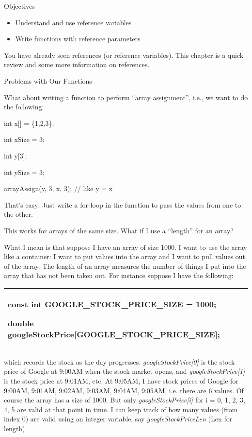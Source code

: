 \documentclass[
]{article}
\author{}
\date{}
\providecommand{\tightlist}{%
  \setlength{\itemsep}{0pt}\setlength{\parskip}{0pt}}
\begin{document}
Objectives

\begin{itemize}
\tightlist
\item
  Understand and use reference variables
\item
  Write functions with reference parameters
\end{itemize}

You have already seen references (or reference variables). This chapter
is a quick review and some more information on references.

Problems with Our Functions

What about writing a function to perform ``array assignment'', i.e., we
want to do the following:

int x{[}{]} = \{1,2,3\};

int xSize = 3;

int y{[}3{]};

int ySize = 3;

arrayAssign(y, 3, x, 3); // like y = x

That's easy: Just write a for-loop in the function to pass the values
from one to the other.

This works for arrays of the same size. What if I use a ``length'' for
an array?

What I mean is that suppose I have an array of size 1000. I want to use
the array like a container: I want to put values into the array and I
want to pull values out of the array. The length of an array measures
the number of things I put into the array that has not been taken out.
For instance suppose I have the following:

\begin{longtable}[]{@{}l@{}}
\toprule
\endhead
\begin{minipage}[t]{0.97\columnwidth}\raggedright
const int GOOGLE\_STOCK\_PRICE\_SIZE = 1000;

double googleStockPrice{[}GOOGLE\_STOCK\_PRICE\_SIZE{]};\strut
\end{minipage}\tabularnewline
\bottomrule
\end{longtable}

which records the stock as the day progresses.
\emph{googleStockPrice{[}0{]}} is the stock price of Google at 9:00AM
when the stock market opens, and \emph{googleStockPrice{[}1{]}} is the
stock price at 9:01AM, etc. At 9:05AM, I have stock prices of Google for
9:00AM, 9:01AM, 9:02AM, 9:03AM, 9:04AM, 9:05AM, i.e. there are 6 values.
Of course the array has a size of 1000. But only
\emph{googleStockPrice{[}i{]}} for i = 0, 1, 2, 3, 4, 5 are valid at
that point in time. I can keep track of how many values (from index 0)
are valid using an integer variable, say \emph{googleStockPriceLen} (Len
for length).
\end{document}
